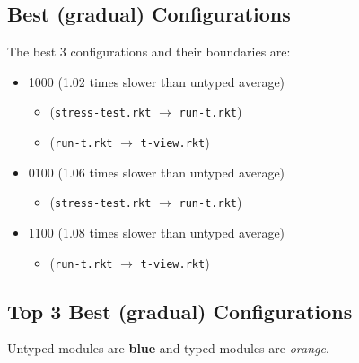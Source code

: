 \documentclass{article}
\newcommand{\mono}[1]{\texttt{#1}}
\begin{document}
\subsection{Best (gradual) Configurations}
The best 3 configurations and their boundaries are:
\begin{itemize}
\item 1000 (1.02 times slower than untyped average)
  \begin{itemize}
  \item (\mono{stress-test.rkt} $\rightarrow$ \mono{run-t.rkt})
  \item (\mono{run-t.rkt} $\rightarrow$ \mono{t-view.rkt})
  \end{itemize}
\item 0100 (1.06 times slower than untyped average)
  \begin{itemize}
  \item (\mono{stress-test.rkt} $\rightarrow$ \mono{run-t.rkt})
  \end{itemize}
\item 1100 (1.08 times slower than untyped average)
  \begin{itemize}
  \item (\mono{run-t.rkt} $\rightarrow$ \mono{t-view.rkt})
  \end{itemize}
\end{itemize}

\subsection{Top 3 Best (gradual) Configurations}
Untyped modules are \textbf{blue} and typed modules are \emph{orange}.
\end{document}
